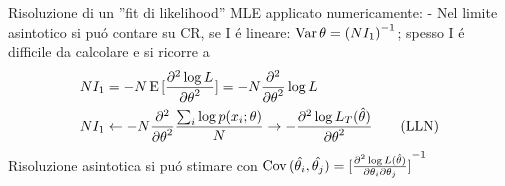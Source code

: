 \documentclass[asd-beamer.tex]{subfiles}%
\begin{document}
\begin{frame}{Risoluzione di un ''fit di likelihood''}\frameintoc
MLE applicato numericamente:  - Nel limite asintotico si pu\'o contare su CR, se I \'e lineare: $\operatorname{Var}{\theta}={(NI_1)}^{-1}$; spesso I \'e difficile da calcolare e si ricorre a
\begin{align*}
&NI_1=-N\operatorname{E}{[\frac{\partial^2 \log{L}}{{\partial \theta}^2}]}=-N\frac{\partial^2}{{\partial \theta}^2}\log{L}\\
&NI_1\gets-N\frac{\partial^2}{{\partial \theta}^2}\frac{\sum_i\log{p(x_i;\theta)}}{N}\to-\frac{\partial^2 \log{L_T(\hat{\theta})}}{{\partial \theta}^2}\tag{LLN}
\end{align*}
Risoluzione asintotica si pu\'o stimare con $\operatorname{Cov}{(\hat{\theta_i},\hat{\theta_j})}={[\frac{\partial^2\log{L(\hat{\theta})}}{\partial\theta_i\partial\theta_j}]}^{-1}$
\end{frame}

\end{document}
